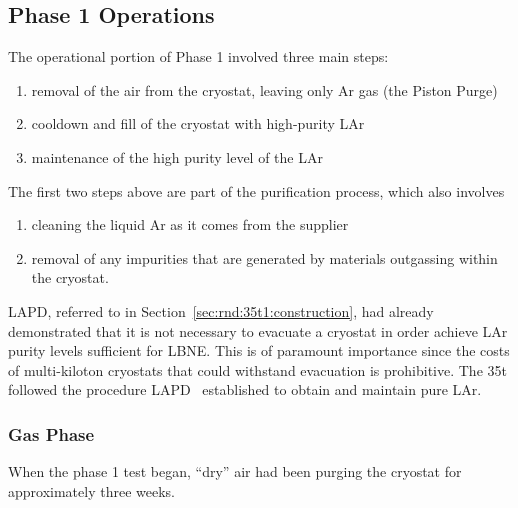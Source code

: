 \subsection {Phase 1 Operations}


The operational portion of Phase 1 involved three main steps: 

\begin{enumerate}
\item{removal of the air from the cryostat, leaving only Ar gas (the Piston Purge)}
\item cooldown and fill of the cryostat with high-purity LAr
\item maintenance of the high purity level of the LAr
\end{enumerate}

The first two steps above are part of the purification process, which also involves 
\begin{enumerate}
\item{cleaning the liquid Ar as it comes from the supplier}
\item{removal of any impurities that are generated by materials outgassing within the cryostat.}
\end{enumerate}
  
LAPD, referred to in Section~\ref{sec:rnd:35t1:construction},
 had already demonstrated that it is not necessary to evacuate a cryostat in order achieve 
LAr purity levels sufficient for LBNE. 
This is of paramount importance since the costs of multi-kiloton cryostats that 
could withstand evacuation is prohibitive. 
The 35t followed the procedure LAPD~\cite{bib:lapdP07005}
established to obtain and maintain pure LAr. 

\subsubsection {Gas Phase}

When the phase 1 test began, ``dry'' air had been purging the cryostat for approximately three weeks. 

